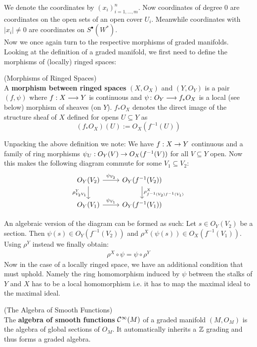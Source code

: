 We denote the coordinates by $(x_i)^n_{i= 1,...,m}$. Now coordinates of degree $0$ are coordinates on the open sets of an open cover $U_i$. Meanwhile coordinates with $|x_i| \neq 0$ are coordinates on $S^\bullet(W^*)$.\\

Now we once again turn to the respective morphisms of graded manifolds. Looking at the definition of a graded manifold, we first need to define the morphisms of (locally) ringed spaces:

\begin{definition} (Morphisms of Ringed Spaces)\\
  A \textbf{morphism between ringed spaces} $(X,O_X)$ and $(Y,O_Y)$ is a pair $(f, \psi)$ where $f:X \longrightarrow Y$ is continuous and $\psi \colon O_Y \longrightarrow f_* O_X$
  is a local (see below) morphism  of sheaves (on $Y$). $f_* O_X$ denotes the direct image of the structure sheaf of $X$ defined for opens $U\subseteq Y$ as
  $$ (f_* O_X)(U) := O_X(f^{-1}(U)) $$
\end{definition}

Unpacking the above definition we note: We have $f:X \rightarrow Y$ continuous and a family of ring morphisms $\psi_U: O_Y(V) \rightarrow O_X(f^{-1}(V))$ for all $V\subseteq Y$ open. Now this makes the following diagram commute for some $V_1 \subseteq V_2$:
\[
\begin{tikzcd}
  O_Y(V_2) \arrow{r}{\psi_{V_2}} \arrow[swap]{d}{\rho^Y_{V_2 V_1}} & O_Y(f^{-1}(V_2)) \arrow{d}{\rho^X_{f^{-1}(V_2) f^{-1}(V_1)}} \\
  O_Y(V_1) \arrow{r}{\psi_{V_1}} & O_Y(f^{-1}(V_1))
\end{tikzcd}
\]

An algebraic version of the diagram can be formed as such: Let $s\in O_Y(V_2)$ be a section. Then $\psi(s) \in O_Y(f^{-1}(V_2))$ and $\rho^X(\psi(s)) \in O_X(f^{-1}(V_1))$. Using $\rho^Y$ instead we finally obtain:
\begin{align}
  \rho^X \circ \psi = \psi \circ \rho^Y
\end{align}
Now in the case of a locally ringed space, we have an additional condition that must uphold. Namely the ring homomorphism induced by $\psi$ between the stalks of $Y$ and $X$ has to be a local homomorphism i.e. it has to map the maximal ideal to the maximal ideal.

\begin{definition} (The Algebra of Smooth Functions)\\
  The \textbf{algebra of smooth functions} $\mathcal{C}^{\infty}(M)$ of a graded manifold $(M, O_M)$ is the algebra of global sections of $O_M$. It automatically inherits a $\mathbb{Z}$ grading and thus forms a graded algebra.
\end{definition}

